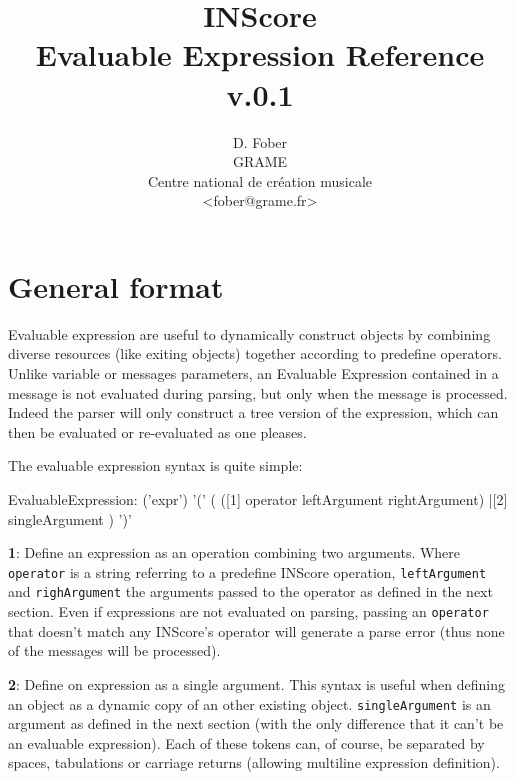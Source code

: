\documentclass[a4paper,twoside]{report}
\newcommand{\toplevel}[1]	{\chapter{#1}}
\newcommand{\OSC}[1]		{\texttt{#1}}
\let\olditemize\itemize
\let\oldenditemize\enditemize
\renewenvironment{itemize} 	{\olditemize \setlength{\itemsep}{1mm}}{\oldenditemize}
\begin{document}
\title{INScore \\ Evaluable Expression Reference \\v.0.1}

\author{D. Fober\\ GRAME\\ Centre national de cr\'eation musicale\\
{\small <fober@grame.fr>} \\
}

\maketitle


\tableofcontents

\pagestyle{plain}

\newpage

\setcounter{page}{1}

\toplevel{General format}
\label{genformat}

Evaluable expression are useful to dynamically construct objects by combining diverse resources (like exiting objects) together according to predefine operators. Unlike variable or messages parameters, an Evaluable Expression contained in a message is not evaluated during parsing, but only when the message is processed. Indeed the parser will only construct a tree version of the expression, which can then be evaluated or re-evaluated as one pleases. 

The evaluable expression syntax is quite simple:

\begin{rail}
EvaluableExpression: 	('expr')
						'('
						( 
						  ([1] operator leftArgument rightArgument)
						  |[2] singleArgument
						)
						')'
\end{rail}

\begin{itemize}
\item \textbf{1}: Define an expression as an operation combining two arguments. Where \OSC{operator} is a string referring to a predefine INScore operation, \OSC{leftArgument} and \OSC{righArgument} the arguments passed to  the operator as defined in the next section. Even if expressions are not evaluated on parsing, passing an \OSC{operator} that doesn't match any INScore's operator will generate a parse error (thus none of the messages will be processed).
\item \textbf{2}: Define on expression as a single argument. This syntax is useful when defining an object as a dynamic copy of an other existing object. \OSC{singleArgument} is an argument as defined in the next section (with the only difference that it can't be an evaluable expression). 
\end{itemize}
Each of these tokens can, of course, be separated by spaces, tabulations or carriage returns (allowing multiline expression definition).
\end{document}
